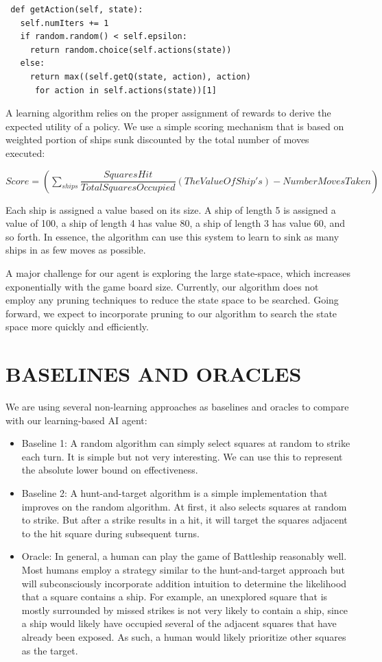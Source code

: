 \documentclass{article}
\begin{document}
\begin{multicols}{2}
\begin{footnotesize}
\begin{verbatim}
 def getAction(self, state):
   self.numIters += 1
   if random.random() < self.epsilon:
     return random.choice(self.actions(state))
   else:
     return max((self.getQ(state, action), action)
      for action in self.actions(state))[1]

\end{verbatim}
\end{footnotesize}

A learning algorithm relies on the proper assignment of rewards to derive the expected utility of a policy. We use a simple scoring mechanism that is based on weighted portion of ships sunk discounted by the total number of moves executed:

{\footnotesize $Score=(\displaystyle\sum_{ships} \dfrac{Squares Hit}{Total Squares Occupied}(The Value Of Ship's)-NumberMovesTaken)$}

Each ship is assigned a value based on its size. A ship of length 5 is assigned a value of 100, a ship of length 4 has value 80, a ship of length 3 has value 60, and so forth. In essence, the algorithm can use this system to learn to sink as many ships in as few moves as possible.

A major challenge for our agent is exploring the large state-space, which increases exponentially with the game board size. Currently, our algorithm does not employ any pruning techniques to reduce the state space to be searched. Going forward, we expect to incorporate pruning to our algorithm to search the state space more quickly and efficiently.
\section{BASELINES AND ORACLES}
We are using several non-learning approaches as baselines and oracles to compare with our learning-based AI agent:
\begin{itemize}

\item	Baseline 1: A random algorithm can simply select squares at random to strike each turn. It is simple but not very interesting. We can use this to represent the absolute lower bound on effectiveness.
\item	Baseline 2: A hunt-and-target algorithm is a simple implementation that improves on the random algorithm. At first, it also selects squares at random to strike. But after a strike results in a hit, it will target the squares adjacent to the hit square during subsequent turns. 
\item 	Oracle: In general, a human can play the game of Battleship reasonably well. Most humans employ a strategy similar to the hunt-and-target approach but will subconsciously incorporate addition intuition to determine the likelihood that a square contains a ship. For example, an unexplored square that is mostly surrounded by missed strikes is not very likely to contain a ship, since a ship would likely have occupied several of the adjacent squares that have already been exposed. As such, a human would likely prioritize other squares as the target.



\end{itemize}
\end{multicols}
\end{document}
